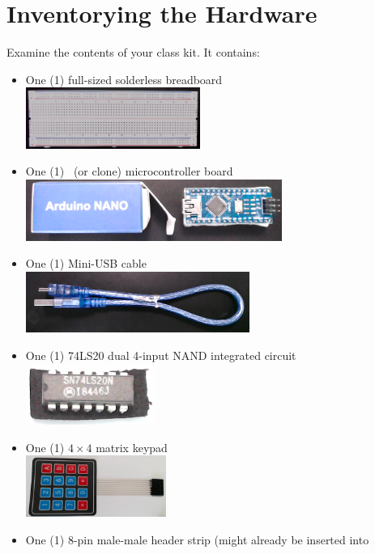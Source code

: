 \section{Inventorying the Hardware} \label{inventory}

Examine the contents of your class kit. It contains:

\begin{itemize}
    \item One (1) full-sized solderless breadboard \\
        \includegraphics[height=2cm]{breadboard}
    \item One (1) \nano\ (or clone) microcontroller board \\
        \includegraphics[height=2cm]{nano}
    \item One (1) Mini-USB cable \\
        \includegraphics[height=2cm]{usb}
    \item One (1) 74LS20 dual 4-input NAND integrated circuit \\
        \includegraphics[height=2cm]{nand}
    \item One (1) $4 \times 4$ matrix keypad \\
        \includegraphics[height=2cm]{keypad}
    \item One (1) 8-pin male-male header strip (might already be inserted into

\end{itemize}
